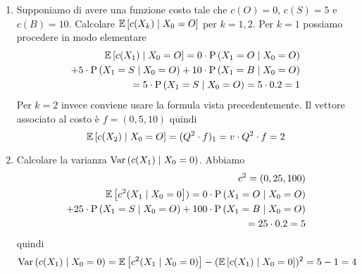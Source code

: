 \begin{exrc}
\begin{enumerate}
	\item Supponiamo di avere una funzione costo tale che $c(O)=0$,  $c(S)=5$ e $c(B)=10$. Calcolare $ \mathbb{E}\left[c(X_k) \mid X_0 = O\right] $ per $ k = 1,2 $.
	Per $ k = 1 $ possiamo procedere in modo elementare  
	\begin{equation*}
		\begin{aligned}
		\mathbb{E}\left[c(X_1) \mid X_0 = O\right] = 0 \cdot \text{P}\left(X_1 = O \mid X_0 = O \right) \\
		+ 5 \cdot \text{P}\left(X_1 = S \mid X_0 = O\right) + 10 \cdot \text{P}\left(X_1 = B \mid X_0 = O\right) \\
		= 5 \cdot \text{P}\left(X_1 = S \mid X_0 = O\right) = 5 \cdot 0.2 = 1 
		\end{aligned}
	\end{equation*}
	Per $ k = 2 $ invece conviene usare la formula vista precedentemente. Il vettore associato al costo \`e $f = (0, 5, 10)$ quindi
	\begin{equation*}
			\mathbb{E}\left[c(X_2) \mid X_0 = O\right] = (Q^2 \cdot f)_1 = v\cdot Q^2\cdot f =  2
	\end{equation*}
	\item Calcolare la varianza $\text{Var}\left(c(X_1) \mid X_0 = 0\right)$. 
	Abbiamo
	\begin{equation*}
		\begin{aligned}
				c^2=(0, 25, 100) \\
		\mathbb{E}\left[c^2(X_1 \mid X_0 = 0\right]) = 0 \cdot \text{P}\left(X_1 = O \mid X_0 = O \right) \\
		+ 25 \cdot \text{P}\left(X_1 = S \mid X_0 = O \right) + 100 \cdot \text{P}\left(X_1 = B \mid X_0 = O \right) \\ 
		= 25 \cdot 0.2 = 5
		\end{aligned}
	\end{equation*}
	quindi $$\text{Var}\left(c(X_1) \mid X_0 = 0\right) = 
		\mathbb{E}\left[c^2(X_1 \mid X_0 = 0)\right] - (\mathbb{E}\left[c(X_1) \mid X_0 = 0\right])^2 =5-1=4$$


\end{enumerate}
\end{exrc}

